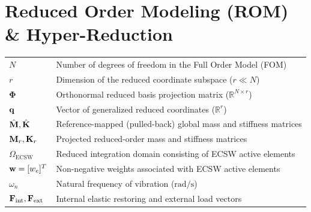 \section*{Reduced Order Modeling (ROM) \& Hyper-Reduction}
\begin{tabular}{p{3.0cm} p{11.0cm}}
    $N$                         & Number of degrees of freedom in the Full Order Model (FOM) \\
    $r$                         & Dimension of the reduced coordinate subspace ($r \ll N$) \\
    $\boldsymbol{\Phi}$         & Orthonormal reduced basis projection matrix ($\mathbb{R}^{N \times r}$) \\
    $\mathbf{q}$                  & Vector of generalized reduced coordinates ($\mathbb{R}^r$) \\
    $\hat{\mathbf{M}}, \hat{\mathbf{K}}$ & Reference-mapped (pulled-back) global mass and stiffness matrices \\
    $\mathbf{M}_r, \mathbf{K}_r$      & Projected reduced-order mass and stiffness matrices \\
    $\Omega_{\text{ECSW}}$       & Reduced integration domain consisting of ECSW active elements \\
    $\mathbf{w} = [w_e]^T$        & Non-negative weights associated with ECSW active elements \\
    $\omega_n$                  & Natural frequency of vibration ($\text{rad/s}$) \\
    $\mathbf{F}_{\text{int}}, \mathbf{F}_{\text{ext}}$ & Internal elastic restoring and external load vectors \\
\end{tabular}
